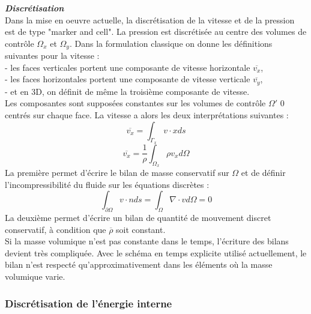 \textit{\textbf{Discr\'etisation}}
\smallskip \\

Dans la mise en oeuvre actuelle, la discr\'etisation de la vitesse et de la pression est de type "marker and cell". La pression est discr\'etis\'ee au centre des volumes de contr\^ole $\Omega_{x}$ et $\Omega_{y}$. Dans la formulation classique on donne les d\'efinitions suivantes pour la vitesse :\\
- les faces verticales portent une composante de vitesse horizontale $\overline{v_{x}}$,\\
- les faces horizontales portent une composante de vitesse verticale $\overline{v_{y}}$,\\
- et en 3D, on d\'efinit de même la troisi\`eme composante de vitesse.\\
Les composantes sont suppos\'ees constantes sur les volumes de contr\^ole $\Omega'$ 0 centr\'es sur chaque face. La vitesse a alors les deux interpr\'etations suivantes :
\begin{equation}
\overline{v_{x}} = \int_{\Gamma_{x}} v \cdot x ds
\end{equation}
\begin{equation}
\overline{v_{x}} = \dfrac{1}{\rho} \int_{\Omega_{x}} \rho v_{x} d\Omega
\end{equation}
La premi\`ere permet d'\'ecrire le bilan de masse conservatif sur $\Omega$ et de d\'efinir l'incompressibilit\'e du fluide sur les \'equations discr\`etes :
\begin{equation}
\int_{\partial\Omega} v \cdot n ds = \int_{\Omega} \nabla \cdot v d\Omega = 0
\end{equation}
La deuxi\`eme permet d'\'ecrire un bilan de quantit\'e de mouvement discret conservatif, \`a condition que $\overline{\rho}$ soit constant.\\
Si la masse volumique n'est pas constante dans le temps, l'\'ecriture des bilans
devient tr\`es compliqu\'ee. Avec le sch\'ema en temps explicite utilis\'e actuellement, le bilan n'est respect\'e qu'approximativement dans les \'el\'ements o\`u la masse volumique varie.

\subsubsection{Discr\'etisation de l'\'energie interne}

